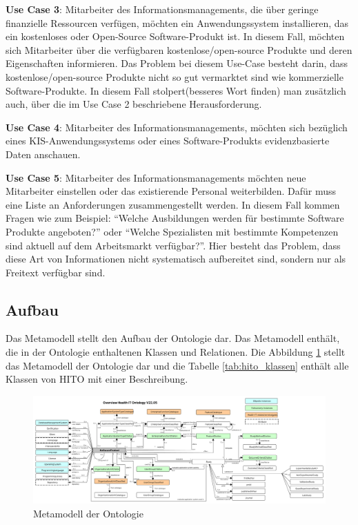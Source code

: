 \textbf{Use Case 3}: Mitarbeiter des Informationsmanagements, die über geringe finanzielle Ressourcen verfügen, möchten ein Anwendungssystem installieren, das ein kostenloses oder Open-Source Software-Produkt ist.
In diesem Fall, möchten sich Mitarbeiter über die verfügbaren kostenlose/open-source Produkte und deren Eigenschaften informieren.
Das Problem bei diesem Use-Case besteht darin, dass kostenlose/open-source Produkte nicht so gut vermarktet sind wie kommerzielle Software-Produkte. 
In diesem Fall stolpert(besseres Wort finden) man zusätzlich auch, über die im Use Case 2 beschriebene Herausforderung. \newline

\textbf{Use Case 4}: Mitarbeiter des Informationsmanagements, möchten sich bezüglich eines KIS-Anwendungssystems oder eines Software-Produkts evidenzbasierte Daten anschauen.  \newline

\textbf{Use Case 5}: Mitarbeiter des Informationsmanagements möchten neue Mitarbeiter einstellen oder das existierende Personal weiterbilden.
Dafür muss eine Liste an Anforderungen zusammengestellt werden.
In diesem Fall kommen Fragen wie zum Beispiel: \enquote{Welche Ausbildungen werden für bestimmte Software Produkte angeboten?} oder \enquote{Welche Spezialisten mit bestimmte Kompetenzen sind aktuell auf dem Arbeitsmarkt verfügbar?}.
Hier besteht das Problem, dass diese Art von Informationen nicht systematisch aufbereitet sind, sondern nur als Freitext verfügbar sind.\newline

\subsection{Aufbau}

Das Metamodell stellt den Aufbau der Ontologie dar. 
Das Metamodell enthält, die in der Ontologie enthaltenen Klassen und Relationen.
Die Abbildung \ref{fig:metamodel} stellt das Metamodell der Ontologie dar und die Tabelle \ref{tab:hito_klassen} enthält alle Klassen von HITO mit einer Beschreibung.

\begin{figure}
    	\includegraphics[width=\textwidth]{Images/hito_metamodell}
   	\caption{Metamodell der Ontologie}
   	\label{fig:metamodel}
\end{figure}

